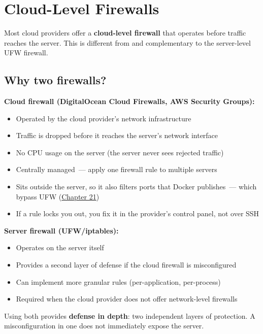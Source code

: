 \setcounter{section}{3}
\section{Cloud-Level Firewalls}\label{22-network-configuration:224-cloud-level-firewalls}

Most cloud providers offer a \textbf{cloud-level firewall} that operates before traffic reaches the server. This is different from and complementary to the server-level UFW firewall.

\subsection*{Why two firewalls?}\label{22-network-configuration:why-two-firewalls}

\textbf{Cloud firewall (DigitalOcean Cloud Firewalls, AWS Security Groups):}

\begin{itemize}
\tightlist
\item
  Operated by the cloud provider's network infrastructure
\item
  Traffic is dropped before it reaches the server's network interface
\item
  No CPU usage on the server (the server never sees rejected traffic)
\item
  Centrally managed~--- apply one firewall rule to multiple servers
\item
  Sits outside the server, so it also filters ports that Docker publishes~--- which bypass UFW (\hyperref[ch:21-system-setup]{Chapter 21})
\item
  If a rule locks you out, you fix it in the provider's control panel, not over SSH
\end{itemize}

\noindent{}\textbf{Server firewall (UFW/iptables):}

\begin{itemize}
\tightlist
\item
  Operates on the server itself
\item
  Provides a second layer of defense if the cloud firewall is misconfigured
\item
  Can implement more granular rules (per-application, per-process)
\item
  Required when the cloud provider does not offer network-level firewalls
\end{itemize}

\noindent{}Using both provides \textbf{defense in depth}: two independent layers of protection. A misconfiguration in one does not immediately expose the server.

